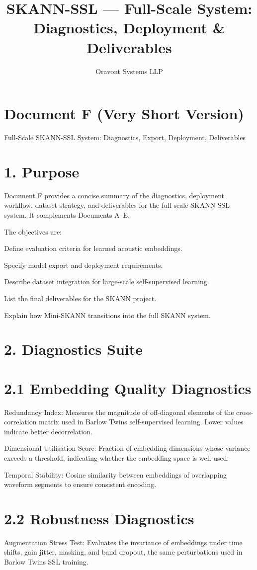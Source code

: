 \documentclass[12pt]{article}
\begin{document}
\title{SKANN-SSL --- Full-Scale System: Diagnostics, Deployment \& Deliverables}
\author{Oravont Systems LLP}
\date{}
\maketitle

\section*{Document F (Very Short Version)}
Full-Scale SKANN-SSL System: Diagnostics, Export, Deployment, Deliverables

\section*{1. Purpose}
Document F provides a concise summary of the diagnostics, deployment workflow, dataset strategy, and deliverables for the full-scale SKANN-SSL system. It complements Documents A–E.

The objectives are:

Define evaluation criteria for learned acoustic embeddings.

Specify model export and deployment requirements.

Describe dataset integration for large-scale self-supervised learning.

List the final deliverables for the SKANN project.

Explain how Mini-SKANN transitions into the full SKANN system.

\section*{2. Diagnostics Suite}
\section*{2.1 Embedding Quality Diagnostics}
Redundancy Index: Measures the magnitude of off-diagonal elements of the cross-correlation matrix  used in Barlow Twins self-supervised learning. Lower values indicate better decorrelation.

Dimensional Utilisation Score: Fraction of embedding dimensions whose variance exceeds a threshold, indicating whether the embedding space is well-used.

Temporal Stability: Cosine similarity between embeddings of overlapping waveform segments to ensure consistent encoding.

\section*{2.2 Robustness Diagnostics}
Augmentation Stress Test: Evaluates the invariance of embeddings under time shifts, gain jitter, masking, and band dropout, the same perturbations used in Barlow Twins SSL training.
\end{document}
